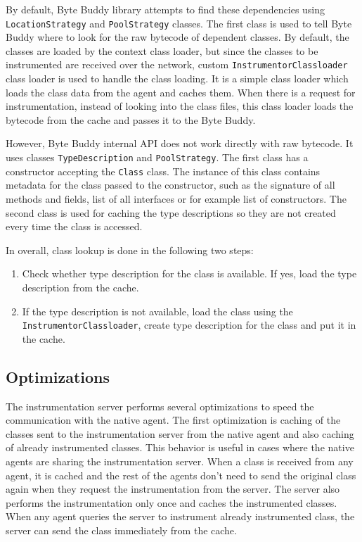 By default, Byte Buddy library attempts to find these dependencies using  \texttt{LocationStrategy} and \texttt{PoolStrategy} classes. The first class is used to tell Byte Buddy where to look for the raw bytecode of dependent classes. By default, the classes are loaded by the context class loader, but since the classes to be instrumented are received over the network, custom \texttt{InstrumentorClassloader} class loader is used to handle the class loading. It is a simple class loader which loads the class data from the agent and caches them. When there is a request for instrumentation, instead of looking into the class files, this class loader loads the bytecode from the cache and passes it to the Byte Buddy.

However, Byte Buddy internal API does not work directly with raw bytecode. It uses classes \texttt{TypeDescription} and \texttt{PoolStrategy}. The first class has a constructor accepting the \texttt{Class} class. The  instance of this class contains metadata for the class passed to the constructor, such as the signature of all methods and fields, list of all interfaces or for example list of constructors. The second class is used for caching the type descriptions so they are not created every time the class is accessed. 

In overall, class lookup is done in the following two steps:
\begin{enumerate}
	\item Check whether type description for the class is available. If yes, load the type description from the cache.
	\item If the type description is not available, load the class using the \linebreak \texttt{InstrumentorClassloader}, create type description for the class and put it in the cache.
\end{enumerate}

\subsection{Optimizations}
The instrumentation server performs several optimizations to speed the communication with the native agent. The first optimization is caching of the classes sent to the instrumentation server from the native agent and also caching of already instrumented classes. This behavior is useful in cases where the native agents are sharing the instrumentation server. When a class is received from any agent, it is cached and the rest of the agents don't need to send the original class again when they request the instrumentation from the server. The server also performs the instrumentation only once and caches the instrumented classes. When any agent queries the server to instrument already instrumented class, the server can send the class immediately from the cache.


